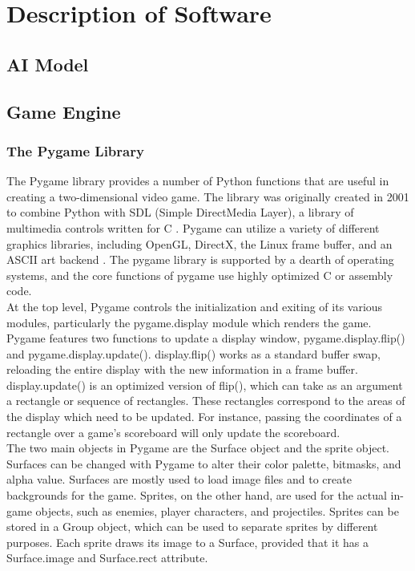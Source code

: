 \chapter{Description of Software}
\section{AI Model}
\section{Game Engine}
\subsection{The Pygame Library}
The Pygame library provides a number of Python functions that are useful in creating a two-dimensional video game. The library was originally created in 2001 to combine Python with SDL (Simple DirectMedia Layer), a library of multimedia controls written for C \cite{shinners}. Pygame can utilize a variety of different graphics libraries, including OpenGL, DirectX, the Linux frame buffer, and an ASCII art backend \cite{shinners}. The pygame library is supported by a dearth of operating systems, and the core functions of pygame use highly optimized C or assembly code.\\

At the top level, Pygame controls the initialization and exiting of its various modules, particularly the pygame.display module which renders the game. Pygame features two functions to update a display window, pygame.display.flip() and pygame.display.update(). display.flip() works as a standard buffer swap, reloading the entire display with the new information in a frame buffer. display.update() is an optimized version of flip(), which can take as an argument a rectangle or sequence of rectangles. These rectangles correspond to the areas of the display which need to be updated. For instance, passing the coordinates of a rectangle over a game's scoreboard will only update the scoreboard.\\

The two main objects in Pygame are the Surface object and the sprite object. Surfaces can be changed with Pygame to alter their color palette, bitmasks, and alpha value. Surfaces are mostly used to load image files and to create backgrounds for the game. Sprites, on the other hand, are used for the actual in-game objects, such as enemies, player characters, and projectiles. Sprites can be stored in a Group object, which can be used to separate sprites by different purposes. Each sprite draws its image to a Surface, provided that it has a Surface.image and Surface.rect attribute.\\

